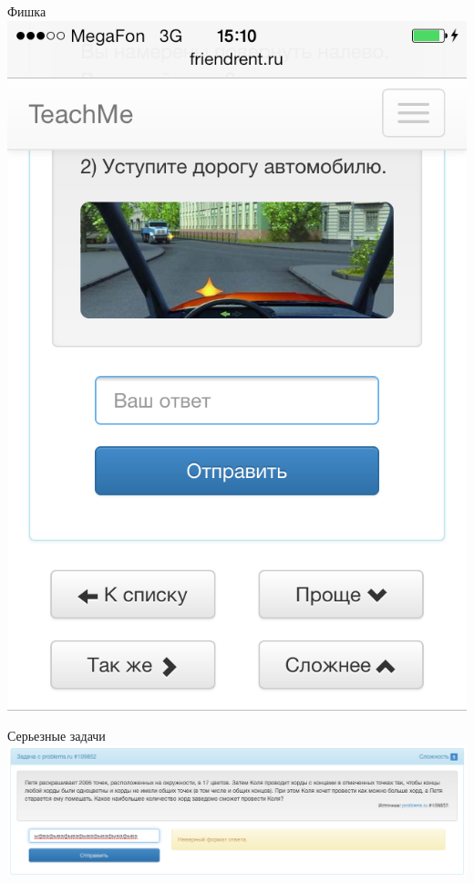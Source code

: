 \documentclass[fullscreen, unicode, bookmarks = false]{beamer}
\begin{document}
\begin{frame}{Фишка}
        \includegraphics[scale=0.22]{fish32.png}
    \end{frame}
        
    \begin{frame}{Серьезные задачи}
        \includegraphics[scale=0.27]{serious.png}
    \end{frame}
    
\end{document}
